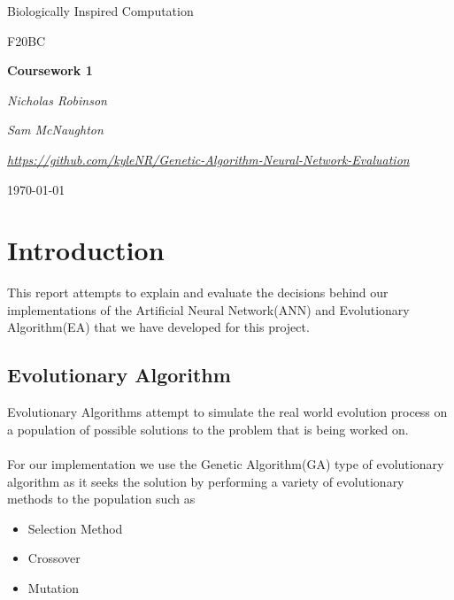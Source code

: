 \documentclass[12pt]{article}
\begin{document}

\begin{titlepage}
	\centering
	\vspace*{4cm}
	{\Large Biologically Inspired Computation \par}
	\vspace{0.5cm}
	{\Large F20BC \par}
	\vspace{2cm}
	{\huge\bfseries Coursework 1 \par}
	\vspace{2cm}
	{\Large\itshape Nicholas Robinson \par}
	{\Large\itshape Sam McNaughton \par}
	\vspace{2cm}
	{\Large\itshape\url{https://github.com/kyleNR/Genetic-Algorithm-Neural-Network-Evaluation} \par}
	\vfill
	{\large \today\par}
	\vspace{1cm}
\end{titlepage}

	\newpage
\section{Introduction}

This report attempts to explain and evaluate the decisions behind our implementations of the Artificial Neural Network(ANN) and Evolutionary Algorithm(EA) that we have developed for this project.

\subsection{Evolutionary Algorithm}

Evolutionary Algorithms attempt to simulate the real world evolution process on a population of possible solutions to the problem that is being worked on.\\\\
For our implementation we use the Genetic Algorithm(GA) type of evolutionary algorithm as it seeks the solution by performing a variety of evolutionary methods to the population such as 

\begin{itemize}

\item Selection Method
\item Crossover
\item Mutation

\end{itemize}
\end{document}
